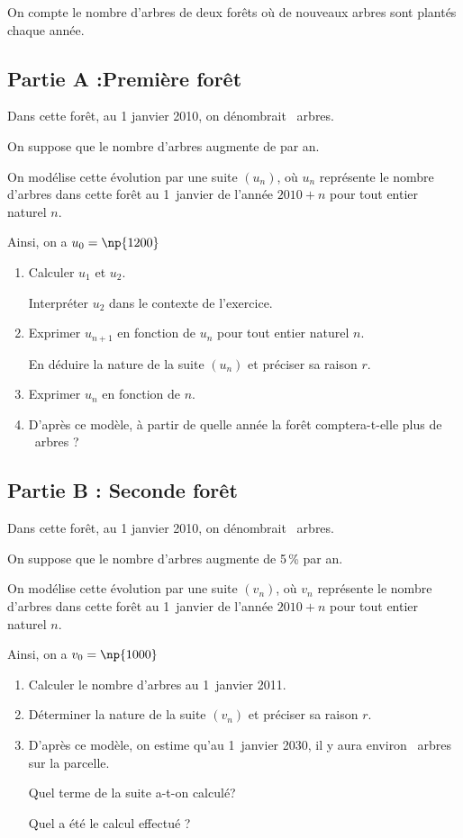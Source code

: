 On compte le nombre d'arbres de deux forêts où de nouveaux arbres sont plantés chaque année.

\subsection*{Partie A :\quad Première forêt}

Dans cette forêt, au 1 janvier 2010, on dénombrait ~arbres.

On suppose que le nombre d'arbres augmente de  par an.

On modélise cette évolution par une suite \mbox{$(u_n)$}, où $u_n$ représente le nombre d'arbres dans cette forêt au 1~janvier de l'année \mbox{$2010+n$} pour tout entier naturel $n$.

Ainsi, on a \mbox{$u_0=\np{1200}$}
\begin{enumerate}
	\item Calculer $u_1$ et $u_2$.

	Interpréter $u_2$ dans le contexte de l'exercice.
	\item Exprimer \mbox{$u_{n+1}$} en fonction de $u_n$ pour tout entier naturel $n$.

	En déduire la nature de la suite $(u_n)$ et préciser sa raison $r$.

	\item Exprimer $u_n$ en fonction de $n$.

	\item D'après ce modèle, à partir de quelle année la forêt comptera-t-elle plus de ~arbres ?
\end{enumerate}

\subsection*{Partie B : \quad Seconde forêt}


Dans cette forêt, au 1 janvier 2010, on dénombrait ~arbres.

On suppose que le nombre d'arbres augmente de 5\,\% par an.

On modélise cette évolution par une suite \mbox{$(v_n)$}, où $v_n$ représente le nombre d'arbres dans cette forêt au 1~janvier de l'année \mbox{$2010+n$} pour tout entier naturel $n$.

Ainsi, on a \mbox{$v_0=\np{1000}$}

\begin{enumerate}
	\item Calculer le nombre d'arbres au 1~janvier 2011.
	\item Déterminer la nature de la suite \mbox{$(v_n)$} et préciser sa raison $r$.
	\item D'après ce modèle, on estime qu'au 1~janvier 2030, il y aura environ ~arbres sur la parcelle.

	Quel terme de la suite a-t-on calculé?

	Quel a été le calcul effectué ?
\end{enumerate}

